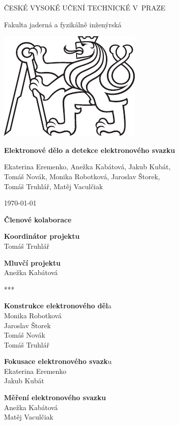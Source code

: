 \documentclass[a4paper,twoside,12pt]{book}
\newcommand{\cvut}{ČESKÉ VYSOKÉ UČENÍ TECHNICKÉ
V~PRAZE}
\newcommand{\nazevcz}{Elektronové dělo a detekce elektronového svazku}
\newcommand{\fjfi}{Fakulta jaderná a fyzikálně inženýrská}
\newcommand{\logoCVUT}{\includegraphics{symbol_cvut_konturova_verze_cb.pdf}}
\begin{document}

\newpage 
\thispagestyle{empty}

\begin{center}
	{\LARGE
		\cvut\par
		\fjfi
	}
    \vspace{10mm}

   \vspace{10mm} \logoCVUT \vspace{15mm} 

   {\huge \textbf{\nazevcz}\par}
   
   \vspace{15mm}
   
   Ekaterina Eremenko, Anežka Kabátová, Jakub Kubát, \\
Tomáš Novák, Monika Robotková, Jaroslav Štorek, \\
Tomáš Truhlář, Matěj Vaculčiak

\vspace{15mm}

\normalsize\today

\end{center}


\newpage 
\thispagestyle{empty}

{\Large
	\textbf{Členové kolaborace}
}

\vspace{5mm}

\begin{center}
\textbf{Koordinátor projektu} \\
Tomáš Truhlář 

    \vspace{5mm}
    
\textbf{Mluvčí projektu} \\
Anežka Kabátová \\

\vspace{3mm}

***

\vspace{3mm}

\textbf{Konstrukce elektronového děl}a \\
Monika Robotková\\
Jaroslav Štorek\\
Tomáš Novák\\
Tomáš Truhlář

   \vspace{5mm}
   
\textbf{Fokusace elektronového svazk}u \\
Ekaterina Eremenko\\
Jakub Kubát


\vspace{5mm}

\textbf{Měření elektronového svazku} \\
Anežka Kabátová \\
Matěj Vaculčiak


\end{center}
\end{document}
